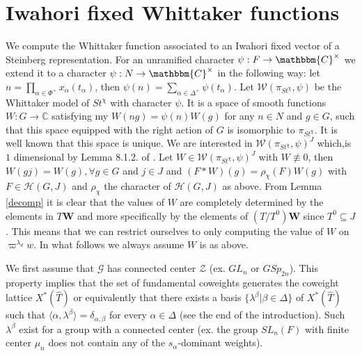 \documentclass{article}
\begin{document}
\section{Iwahori fixed Whittaker functions}
We compute the Whittaker function associated to an Iwahori fixed vector of a Steinberg representation. For an unramified character $\psi:F\to\mathbbm{C}^{\times}$ we extend it to a character $\psi:N \rightarrow \mathbbm{C}^{\times}$ in the following way: let $n=\prod\limits_{\alpha\in\Phi^+}x_{\alpha}(t_{\alpha})$, then 
$\psi(n)=\sum\limits_{\alpha\in\Delta^+}\psi(t_{\alpha})$. Let $\mathcal{W}(\pi_{St^{\chi}},\psi)$ be the Whittaker model of $St^{\chi}$ with character $\psi$. It is a space of smooth functions $W:G\to\mathbb{C}$ satisfying my $W(ng)=\psi(n)W(g)$ for any $n\in N$ and $g\in G$, such that this space equipped with the right action of $G$ is isomorphic to $\pi_{St^{\chi}}$. It is well known that this space is unique.  We are interested in $\mathcal{W}(\pi_{St^{\chi}},\psi)^J$ which,is $1$ dimensional by Lemma 8.1.2. of \cite{cassnotes}. Let $W\in \mathcal{W}(\pi_{St^{\chi}},\psi)^J$ with $W\not\equiv 0$, then $W(gj)=W(g),\forall g\in G$ and $j\in J$ and $(F*W)(g)=\rho_{\chi}(F)W(g)$ with $F\in \mathcal{H}(G,J)$ and $\rho_{\chi}$ the character of $\mathcal{H}(G,J)$ as above. 
From Lemma \ref{decomp} it is clear that the values of $W$ are completely determined by the elements in $T\mathbf{W}$ and more specifically by the elements of $(T/T^0)\mathbf{W}$ since $T^0\subseteq J$. This means that we can restrict ourselves to only computing the value of $W$ on $\varpi^{\lambda_d}w$. In what follows we always assume $W$ is as above. 
\par 
We first assume that $\mathcal{G}$ has connected center $\mathcal{Z}$ (ex. $GL_n$ or $GSp_{2n}$). This property implies that the set of fundamental coweights generates the coweight lattice $X^*(\hat{T})$ or equivalently that there exists a basis $\{\lambda^{\beta}|\beta\in\Delta\}$ of $X^*(\hat{T})$ such that $\langle\alpha,\lambda^{\beta}\rangle=\delta_{\alpha,\beta}$ for every $\alpha\in\Delta$ (see the end of the introduction).  Such $\lambda^{\beta}$ exist for a group with a connected center (ex. the group $SL_n(F)$ with finite center $\mu_n$ does not contain any of the $s_{\alpha}$-dominant weights).
\end{document}
